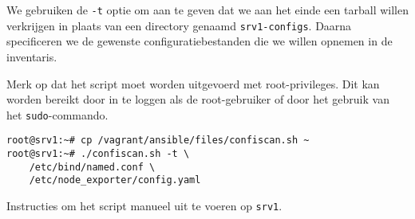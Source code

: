 We gebruiken de \texttt{-t} optie om aan te geven dat we aan het einde een tarball willen verkrijgen in plaats van een directory genaamd \texttt{srv1-configs}.
Daarna specificeren we de gewenste configuratiebestanden die we willen opnemen in de inventaris.

Merk op dat het script moet worden uitgevoerd met root-privileges.
Dit kan worden bereikt door in te loggen als de root-gebruiker of door het gebruik van het \texttt{sudo}-commando.

\begin{listing}
  \begin{verbatim}
root@srv1:~# cp /vagrant/ansible/files/confiscan.sh ~
root@srv1:~# ./confiscan.sh -t \
    /etc/bind/named.conf \
    /etc/node_exporter/config.yaml
  \end{verbatim}
  \caption[Manueel uitvoeren van script op \texttt{srv1}.]{Instructies om het script manueel uit te voeren op \texttt{srv1}.}
  \label{lst:bijlage-run-script-manual}
\end{listing}

